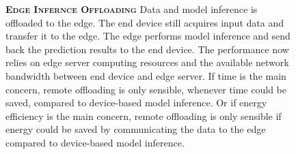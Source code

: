 \begin{figure}
	\begin{minipage}{0.3\linewidth}
		\centering
		\begin{figure}
			\centering
			\captionsetup[subfigure]{justification=centering}
		\end{figure}
	\end{minipage}
	\hfill
	\begin{minipage}{0.65\linewidth}
		\textbf{\protect{} \textsc{Edge Infernce Offloading}}
		\color{caption-color} \newline
		Data and model inference is offloaded to the edge. The end device still acquires input data and transfer it to the edge. The edge performs model inference and send back the prediction results to the end device. The performance now relies on edge server computing resources and the available network bandwidth between end device and edge server. If time is the main concern, remote offloading is only sensible, whenever time could be saved, compared to device-based model inference. Or if energy efficiency is the main concern, remote offloading is only sensible if energy could be saved by communicating the data to the edge compared to device-based model inference.
	\end{minipage}
\end{figure}


